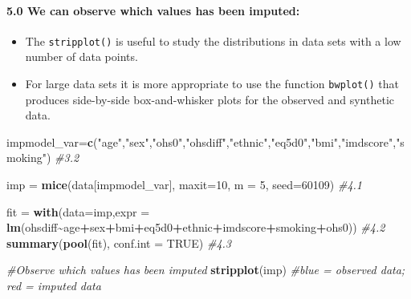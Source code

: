 \documentclass[
]{article}
\newenvironment{Shaded}{\begin{snugshade}}{\end{snugshade}}
\newcommand{\AttributeTok}[1]{\textcolor[rgb]{0.13,0.29,0.53}{#1}}
\newcommand{\CommentTok}[1]{\textcolor[rgb]{0.56,0.35,0.01}{\textit{#1}}}
\newcommand{\ConstantTok}[1]{\textcolor[rgb]{0.56,0.35,0.01}{#1}}
\newcommand{\DecValTok}[1]{\textcolor[rgb]{0.00,0.00,0.81}{#1}}
\newcommand{\FunctionTok}[1]{\textcolor[rgb]{0.13,0.29,0.53}{\textbf{#1}}}
\newcommand{\NormalTok}[1]{#1}
\newcommand{\OtherTok}[1]{\textcolor[rgb]{0.56,0.35,0.01}{#1}}
\newcommand{\SpecialCharTok}[1]{\textcolor[rgb]{0.81,0.36,0.00}{\textbf{#1}}}
\newcommand{\StringTok}[1]{\textcolor[rgb]{0.31,0.60,0.02}{#1}}
\providecommand{\tightlist}{%
  \setlength{\itemsep}{0pt}\setlength{\parskip}{0pt}}
\begin{document}
\hypertarget{we-can-observe-which-values-has-been-imputed}{%
\paragraph{5.0 We can observe which values has been
imputed:}\label{we-can-observe-which-values-has-been-imputed}}

\begin{itemize}
\tightlist
\item
  The \texttt{stripplot()} is useful to study the distributions in data
  sets with a low number of data points.
\item
  For large data sets it is more appropriate to use the function
  \texttt{bwplot()} that produces side-by-side box-and-whisker plots for
  the observed and synthetic data.
\end{itemize}

\begin{Shaded}
\begin{Highlighting}[]
\NormalTok{impmodel\_var}\OtherTok{=}\FunctionTok{c}\NormalTok{(}\StringTok{"age"}\NormalTok{,}\StringTok{"sex"}\NormalTok{,}\StringTok{"ohs0"}\NormalTok{,}\StringTok{"ohsdiff"}\NormalTok{,}\StringTok{"ethnic"}\NormalTok{,}\StringTok{"eq5d0"}\NormalTok{,}\StringTok{"bmi"}\NormalTok{,}\StringTok{"imdscore"}\NormalTok{,}\StringTok{"smoking"}\NormalTok{) }\CommentTok{\#3.2}

\NormalTok{imp }\OtherTok{=} \FunctionTok{mice}\NormalTok{(data[impmodel\_var], }\AttributeTok{maxit=}\DecValTok{10}\NormalTok{, }\AttributeTok{m =} \DecValTok{5}\NormalTok{, }\AttributeTok{seed=}\DecValTok{60109}\NormalTok{)  }\CommentTok{\#4.1}
\end{Highlighting}
\end{Shaded}

\begin{Shaded}
\begin{Highlighting}[]
\NormalTok{fit }\OtherTok{=} \FunctionTok{with}\NormalTok{(}\AttributeTok{data=}\NormalTok{imp,}\AttributeTok{expr =} \FunctionTok{lm}\NormalTok{(ohsdiff}\SpecialCharTok{\textasciitilde{}}\NormalTok{age}\SpecialCharTok{+}\NormalTok{sex}\SpecialCharTok{+}\NormalTok{bmi}\SpecialCharTok{+}\NormalTok{eq5d0}\SpecialCharTok{+}\NormalTok{ethnic}\SpecialCharTok{+}\NormalTok{imdscore}\SpecialCharTok{+}\NormalTok{smoking}\SpecialCharTok{+}\NormalTok{ohs0)) }\CommentTok{\#4.2}
\FunctionTok{summary}\NormalTok{(}\FunctionTok{pool}\NormalTok{(fit), }\AttributeTok{conf.int =} \ConstantTok{TRUE}\NormalTok{) }\CommentTok{\#4.3}

\CommentTok{\#Observe which values has been imputed}
\FunctionTok{stripplot}\NormalTok{(imp) }\CommentTok{\#blue = observed data; red = imputed data}
\end{Highlighting}
\end{Shaded}
\end{document}
